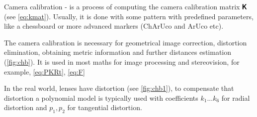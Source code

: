 Camera calibration - is a process of computing the camera calibration matrix $\pmb{\mathsf{K}}$ (see \eqref{eq:kmat}).
Usually, it is done with some pattern with predefined parameters, like a chessboard or more advanced markers (ChArUco and ArUco \cite{aruco} etc).

The camera calibration is necessary for geometrical image correction, distortion elimination, obtaining metric information and further distances estimation (\autoref{fig:chb}). 
It is used in most maths for image processing and stereovision, for example, \eqref{eq:PKRt}, \eqref{eq:F}

In the real world, lenses have distortion (see \autoref{fig:chb1}), to compensate that distortion a polynomial model is typically used with coefficients $k_1 ... k_6$ for radial distortion and $p_1, p_2$ for tangential distortion.

